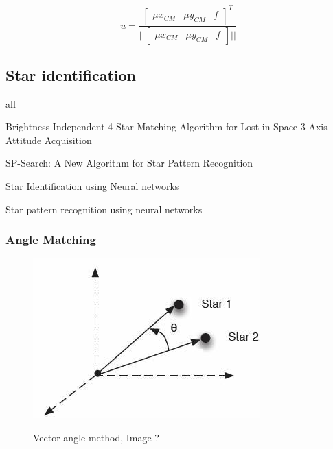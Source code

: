 \documentclass[12pt,a4paper,oneside]{article}
\begin{document}
\begin{equation}
u = \frac{
\begin{bmatrix}
\mu x_{CM} & \mu y_{CM} & f
\end{bmatrix}
^T}
{||
\begin{bmatrix}
\mu x_{CM} & \mu y_{CM} & f
\end{bmatrix}
||}
\end{equation}

\subsection{Star identification}
all \cite{spratling2009survey}\par
Brightness Independent 4-Star Matching Algorithm for Lost-in-Space 3-Axis Attitude Acquisition\cite{dong2006brightness} \par
SP-Search: A New Algorithm for Star Pattern Recognition \cite{mortari1999sp} \par
Star Identification using Neural networks \cite{miri2012star} \cite{lindbladstar} \par
Star pattern recognition using neural networks \cite{li2003star} \par


\subsubsection{Angle Matching}

\begin{figure}[h]
\includegraphics[scale=0.7]{vector_angle_method.jpg}
\centering
\label{fig:angle_matching}
\caption{Vector angle method, Image \cite{gottlieb1978star}?}
\end{figure}
\end{document}
